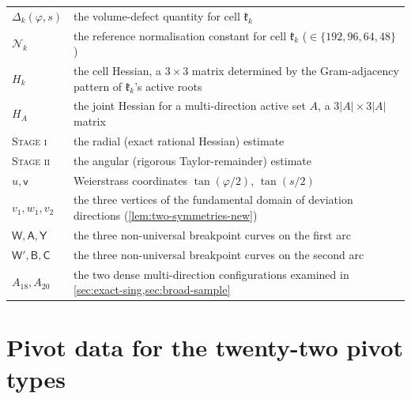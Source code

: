 \documentclass[11pt,reqno]{amsart}
\renewcommand{\_}{\origunderscore\allowbreak}
\numberwithin{equation}{section}
\theoremstyle{plain}
\theoremstyle{definition}
\theoremstyle{remark}
\newcommand{\Cell}[1]{\mathfrak{k}_{#1}}     %
\newcommand{\tilt}{\varphi}                  %
\newcommand{\arcp}{s}                        %
\newcommand{\defect}{\Delta}                 %
\newcommand{\norm}[1]{\mathcal{N}_{#1}}      %
\newcommand{\base}{u}                        %
\newcommand{\stageone}{\textnormal{\scshape Stage i}}
\newcommand{\stagetwo}{\textnormal{\scshape Stage ii}}
\begin{document}
\begin{longtable}{@{}l@{\hspace{1.8em}}l@{}}
$\defect_k(\tilt,\arcp)$ & \parbox[t]{0.76\textwidth}{\raggedright the volume-defect quantity for cell $\Cell{k}$}\\
$\norm{k}$ & \parbox[t]{0.76\textwidth}{\raggedright the reference normalisation constant for cell $\Cell{k}$ ($\in\{192,96,64,48\}$)}\\
$H_k$ & \parbox[t]{0.76\textwidth}{\raggedright the cell Hessian, a $3\times3$ matrix determined by the Gram-adjacency pattern of $\Cell{k}$'s active roots}\\
$H_A$ & \parbox[t]{0.76\textwidth}{\raggedright the joint Hessian for a multi-direction active set $A$, a $3|A|\times3|A|$ matrix}\\
\stageone & \parbox[t]{0.76\textwidth}{\raggedright the radial (exact rational Hessian) estimate}\\
\stagetwo & \parbox[t]{0.76\textwidth}{\raggedright the angular (rigorous Taylor-remainder) estimate}\\
$\base,\mathsf v$ & \parbox[t]{0.76\textwidth}{\raggedright Weierstrass coordinates $\tan(\tilt/2)$, $\tan(\arcp/2)$}\\
$v_1,w_1,v_2$ & \parbox[t]{0.76\textwidth}{\raggedright the three vertices of the fundamental domain of deviation directions (\cref{lem:two-symmetries-new})}\\
$\mathsf W,\mathsf A,\mathsf Y$ & \parbox[t]{0.76\textwidth}{\raggedright the three non-universal breakpoint curves on the first arc}\\
$\mathsf W',\mathsf B,\mathsf C$ & \parbox[t]{0.76\textwidth}{\raggedright the three non-universal breakpoint curves on the second arc}\\
$A_{18},A_{20}$ & \parbox[t]{0.76\textwidth}{\raggedright the two dense multi-direction configurations examined in \cref{sec:exact-sing,sec:broad-sample}}\\
\end{longtable}
\renewcommand{\arraystretch}{1}

\section{Pivot data for the twenty-two pivot types}\label{app:pivot-data}
\end{document}

